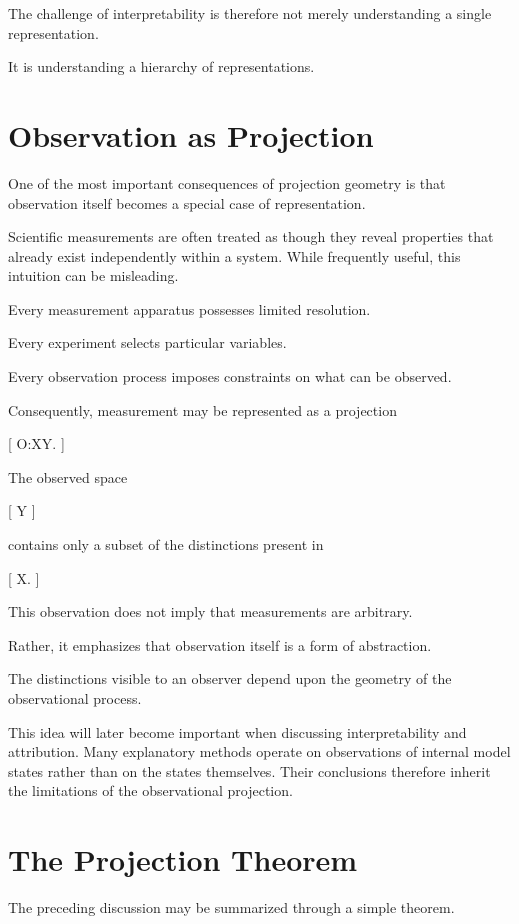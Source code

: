 \documentclass[11pt,oneside,openany]{book}
\begin{document}
The challenge of interpretability is therefore not merely understanding a single representation.

It is understanding a hierarchy of representations.

\section{Observation as Projection}

One of the most important consequences of projection geometry is that observation itself becomes a special case of representation.

Scientific measurements are often treated as though they reveal properties that already exist independently within a system. While frequently useful, this intuition can be misleading.

Every measurement apparatus possesses limited resolution.

Every experiment selects particular variables.

Every observation process imposes constraints on what can be observed.

Consequently, measurement may be represented as a projection

[
O:\mathcal X\rightarrow\mathcal Y.
]

The observed space

[
\mathcal Y
]

contains only a subset of the distinctions present in

[
\mathcal X.
]

This observation does not imply that measurements are arbitrary.

Rather, it emphasizes that observation itself is a form of abstraction.

The distinctions visible to an observer depend upon the geometry of the observational process.

This idea will later become important when discussing interpretability and attribution. Many explanatory methods operate on observations of internal model states rather than on the states themselves. Their conclusions therefore inherit the limitations of the observational projection.

\section{The Projection Theorem}

The preceding discussion may be summarized through a simple theorem.
\end{document}
